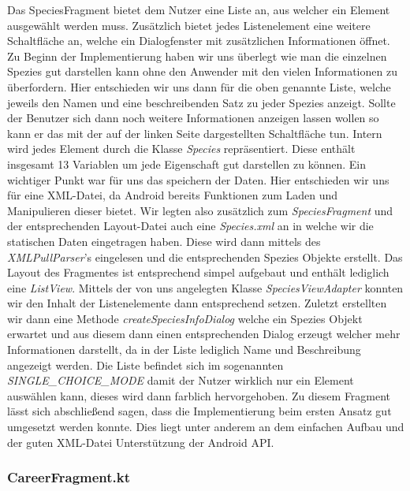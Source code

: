 Das SpeciesFragment bietet dem Nutzer eine Liste an, aus welcher ein Element ausgewählt werden muss. Zusätzlich bietet jedes Listenelement eine weitere Schaltfläche an, welche ein Dialogfenster mit zusätzlichen Informationen öffnet. Zu Beginn der Implementierung haben wir uns überlegt wie man die einzelnen Spezies gut darstellen kann ohne den Anwender mit den vielen Informationen zu überfordern. Hier entschieden wir uns dann für die oben genannte Liste, welche jeweils den Namen und eine beschreibenden Satz zu jeder Spezies anzeigt. Sollte der Benutzer sich dann noch weitere Informationen anzeigen lassen wollen so kann er das mit der auf der linken Seite dargestellten Schaltfläche tun. Intern wird jedes Element durch die Klasse \textit{Species} repräsentiert. Diese enthält insgesamt 13 Variablen um jede Eigenschaft gut darstellen zu können. Ein wichtiger Punkt war für uns das speichern der Daten. Hier entschieden wir uns für eine XML-Datei, da Android bereits Funktionen zum Laden und Manipulieren dieser bietet. Wir legten also zusätzlich zum \textit{SpeciesFragment} und der entsprechenden Layout-Datei auch eine \textit{Species.xml} an in welche wir die statischen Daten eingetragen haben. Diese wird dann mittels des \textit{XMLPullParser}'s eingelesen und die entsprechenden Spezies Objekte erstellt. Das Layout des Fragmentes ist entsprechend simpel aufgebaut und enthält lediglich eine \textit{ListView}. Mittels der von uns angelegten Klasse \textit{SpeciesViewAdapter} konnten wir den Inhalt der Listenelemente dann entsprechend setzen. Zuletzt erstellten wir dann eine Methode \textit{createSpeciesInfoDialog} welche ein Spezies Objekt erwartet und aus diesem dann einen entsprechenden Dialog erzeugt welcher mehr Informationen darstellt, da in der Liste lediglich Name und Beschreibung angezeigt werden. Die Liste befindet sich im sogenannten \textit{SINGLE\_CHOICE\_MODE} damit der Nutzer wirklich nur ein Element auswählen kann, dieses wird dann farblich hervorgehoben. Zu diesem Fragment lässt sich abschließend sagen, dass die Implementierung beim ersten Ansatz gut umgesetzt werden konnte. Dies liegt unter anderem an dem einfachen Aufbau und der guten XML-Datei Unterstützung der Android API.

\subsubsection{CareerFragment.kt}

